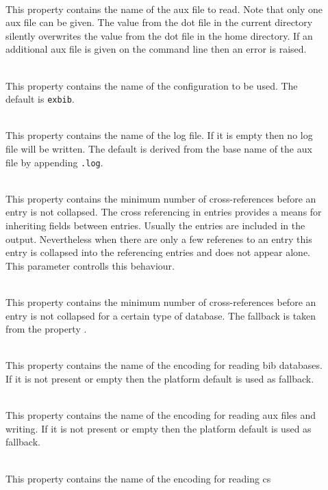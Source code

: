 \begin{description}
\item[] \ \\
  This property contains the name of the aux file to read. Note that
  only one aux file can be given. The value from the dot file in the
  current directory silently overwrites the value from the dot file in
  the home directory. If an additional aux file is given on the
  command line then an error is raised.
\item[] \ \\
  This property contains the name of the configuration to be used. The
  default is \texttt{exbib}.
\item[] \ \\
  This property contains the name of the log file. If it is empty then
  no log file will be written. The default is derived from the base
  name of the aux file by appending \texttt{.log}.
\item[] \ \\
  This property contains the minimum number of cross-references before
  an entry is not collapsed. The cross referencing in entries provides
  a means for inheriting fields between entries. Usually the entries
  are included in the output.  Nevertheless when there are only a few
  referenes to an entry this entry is collapsed into the referencing
  entries and does not appear alone. This parameter controlls this
  behaviour.
\item[] \ \\
  This property contains the minimum number of cross-references before
  an entry is not collapsed for a certain type of database. The
  fallback is taken from the property .
\item[] \ \\
  This property contains the name of the encoding for reading bib
  databases. If it is not present or empty then the platform default
  is used as fallback.
\item[] \ \\
  This property contains the name of the encoding for reading aux
  files and writing. If it is not present or empty then the platform
  default is used as fallback.
\item[] \ \\
  This property contains the name of the encoding for reading cs

\end{description}
